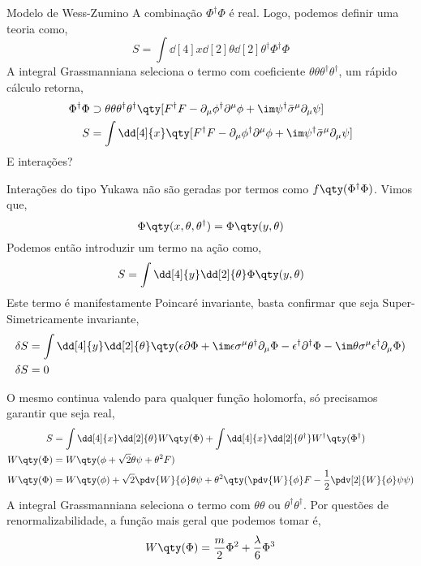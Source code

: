 \documentclass{beamer}
\begin{document}
\begin{frame}{Modelo de Wess-Zumino}
    A combinação $\Phi^\dagger\Phi$ é real. Logo, podemos definir uma teoria como,
    \[S=\int\dd[4]{x}\dd[2]{\theta}\dd[2]{\theta^\dagger}\Phi^\dagger\Phi\]
    A integral Grassmanniana seleciona o termo com coeficiente $\theta\theta\theta^\dagger\theta^\dagger$, um 
    rápido cálculo retorna,
    \begin{align*}
        \Phi^\dagger\Phi&\supset\theta\theta\theta^\dagger\theta^\dagger\qty[F^\dagger F-\partial_\mu\phi^\dagger\partial^\mu\phi+\im\psi^\dagger{\bar\sigma}^\mu\partial_\mu\psi]\\
        S&=\int\dd[4]{x}\qty[F^\dagger F-\partial_\mu\phi^\dagger\partial^\mu\phi+\im\psi^\dagger{\bar\sigma}^\mu\partial_\mu\psi]
    \end{align*}
    E interações?
\end{frame}

\begin{frame}
    Interações do tipo Yukawa não são geradas por termos como $f\qty(\Phi^\dagger\Phi)$. Vimos que,
    \[\Phi\qty(x,\theta,\theta^\dagger)=\Phi\qty(y,\theta)\]
    Podemos então introduzir um termo na ação como,
    \[S=\int\dd[4]{y}\dd[2]{\theta}\Phi\qty(y,\theta)\]
    Este termo é manifestamente Poincaré invariante, basta confirmar que 
    seja Super-Simetricamente invariante,
    \begin{align*}
        \delta S&=\int\dd[4]{y}\dd[2]{\theta}\qty(\epsilon\partial\Phi+\im\epsilon\sigma^\mu\theta^\dagger\partial_\mu\Phi
        -\epsilon^\dagger\partial^\dagger\Phi-\im\theta\sigma^\mu\epsilon^\dagger\partial_\mu\Phi)\\
        \delta S&=0
    \end{align*}
\end{frame}

\begin{frame}
    O mesmo continua valendo para qualquer função holomorfa, só precisamos garantir que seja real,
    \begin{align*}
        S&=\int\dd[4]{x}\dd[2]{\theta}W\qty(\Phi)+\int\dd[4]{x}\dd[2]{\theta^\dagger}W^\dagger\qty(\Phi^\dagger)\\
        W\qty(\Phi)&=W\qty(\phi+\sqrt2\theta\psi+\theta^2F)\\
        W\qty(\Phi)&=W\qty(\phi)+\sqrt2\pdv{W}{\phi}\theta\psi+\theta^2\qty(\pdv{W}{\phi}F-\frac12\pdv[2]{W}{\phi}\psi\psi)
    \end{align*}
    A integral Grassmanniana seleciona o termo com $\theta\theta$ ou $\theta^{\dagger}\theta^\dagger$. Por questões de 
    renormalizabilidade, a função mais geral que podemos tomar é,
    \[W\qty(\Phi)=\frac m2\Phi^2+\frac\lambda6\Phi^3\]
\end{frame}
\end{document}
